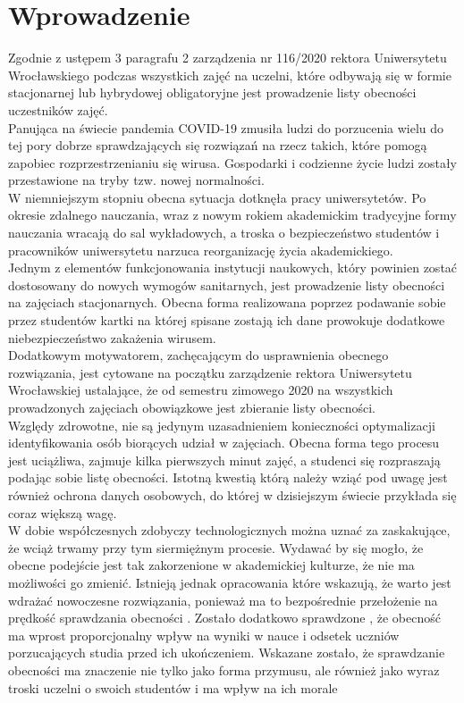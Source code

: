 \documentclass[declaration,shortabstract, mgr]{iithesis}
\author {Dawid Szczyrk}
\begin{document}
\chapter{Wprowadzenie}


\indent Zgodnie z ustępem 3 paragrafu 2 zarządzenia nr 116/2020 rektora Uniwersytetu Wrocławskiego \cite{uwr} podczas wszystkich zajęć na uczelni, które odbywają się w formie stacjonarnej lub hybrydowej obligatoryjne jest prowadzenie listy obecności uczestników zajęć.\\
\indent Panująca na świecie pandemia COVID-19 zmusiła ludzi do porzucenia wielu do tej pory dobrze sprawdzających się rozwiązań na rzecz takich, które pomogą zapobiec rozprzestrzenianiu się wirusa. Gospodarki i codzienne życie ludzi zostały przestawione na tryby tzw. nowej normalności.\\
\indent W niemniejszym stopniu obecna sytuacja dotknęła pracy uniwersytetów. Po okresie zdalnego nauczania, wraz z nowym rokiem akademickim tradycyjne formy nauczania wracają do sal wykładowych, a troska o bezpieczeństwo studentów i pracowników uniwersytetu narzuca reorganizację życia akademickiego.\\
\indent Jednym z elementów funkcjonowania instytucji naukowych, który powinien zostać dostosowany do nowych wymogów sanitarnych, jest prowadzenie listy obecności na zajęciach stacjonarnych. Obecna forma realizowana poprzez podawanie sobie przez studentów kartki na której spisane zostają ich dane prowokuje dodatkowe niebezpieczeństwo zakażenia wirusem. \\
\indent Dodatkowym motywatorem, zachęcającym do usprawnienia obecnego rozwiązania, jest cytowane na początku zarządzenie rektora Uniwersytetu Wrocławskiej ustalające, że od semestru zimowego 2020 na wszystkich prowadzonych zajęciach obowiązkowe jest zbieranie listy obecności. \\
\indent Względy zdrowotne, nie są jedynym uzasadnieniem konieczności optymalizacji identyfikowania osób biorących udział w zajęciach. Obecna forma tego procesu jest uciążliwa, zajmuje kilka pierwszych minut zajęć, a studenci się rozpraszają podając sobie listę obecności. Istotną kwestią którą należy wziąć pod uwagę jest również ochrona danych osobowych, do której w dzisiejszym świecie przykłada się coraz większą wagę.\\
\indent W dobie współczesnych zdobyczy technologicznych można uznać za zaskakujące, że wciąż trwamy przy tym siermiężnym procesie. Wydawać by się mogło, że obecne podejście jest tak zakorzenione w akademickiej kulturze, że nie ma możliwości go zmienić. Istnieją jednak opracowania które wskazują, że warto jest wdrażać nowoczesne rozwiązania, ponieważ ma to bezpośrednie przełożenie na prędkość sprawdzania obecności \cite{lcd}. Zostało dodatkowo sprawdzone \cite{theory_base}, że obecność ma wprost proporcjonalny wpływ na wyniki w nauce i odsetek uczniów porzucających studia przed ich ukończeniem. Wskazane zostało, że sprawdzanie obecności ma znaczenie nie tylko jako forma przymusu, ale również jako wyraz troski uczelni o swoich studentów i ma wpływ na ich morale\\
\end{document}

